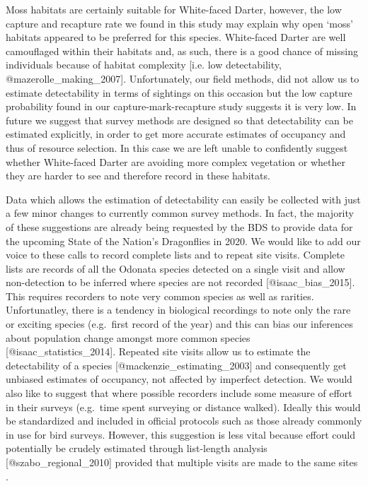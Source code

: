 \documentclass[]{article}
\begin{document}
Moss habitats are certainly suitable for White-faced Darter, however,
the low capture and recapture rate we found in this study may explain
why open `moss' habitats appeared to be preferred for this species.
White-faced Darter are well camouflaged within their habitats and, as
such, there is a good chance of missing individuals because of habitat
complexity {[}i.e. low detectability, @mazerolle\_making\_2007{]}.
Unfortunately, our field methods, did not allow us to estimate
detectability in terms of sightings on this occasion but the low capture
probability found in our capture-mark-recapture study suggests it is
very low. In future we suggest that survey methods are designed so that
detectability can be estimated explicitly, in order to get more accurate
estimates of occupancy and thus of resource selection. In this case we
are left unable to confidently suggest whether White-faced Darter are
avoiding more complex vegetation or whether they are harder to see and
therefore record in these habitats.

Data which allows the estimation of detectability can easily be
collected with just a few minor changes to currently common survey
methods. In fact, the majority of these suggestions are already being
requested by the BDS to provide data for the upcoming State of the
Nation's Dragonflies in 2020. We would like to add our voice to these
calls to record complete lists and to repeat site visits. Complete lists
are records of all the Odonata species detected on a single visit and
allow non-detection to be inferred where species are not recorded
{[}@isaac\_bias\_2015{]}. This requires recorders to note very common
species as well as rarities. Unfortunatley, there is a tendency in
biological recordings to note only the rare or exciting species
(e.g.~first record of the year) and this can bias our inferences about
population change amongst more common species
{[}@isaac\_statistics\_2014{]}. Repeated site visits allow us to
estimate the detectability of a species
{[}@mackenzie\_estimating\_2003{]} and consequently get unbiased
estimates of occupancy, not affected by imperfect detection. We would
also like to suggest that where possible recorders include some measure
of effort in their surveys (e.g.~time spent surveying or distance
walked). Ideally this would be standardized and included in official
protocols such as those already commonly in use for bird surveys.
However, this suggestion is less vital because effort could potentially
be crudely estimated through list-length analysis
{[}@szabo\_regional\_2010{]} provided that multiple visits are made to
the same sites .
\end{document}
